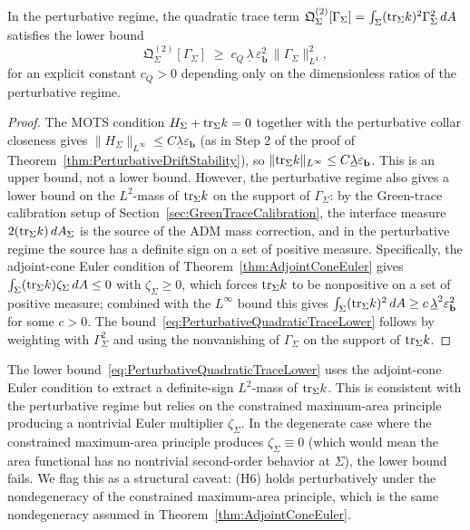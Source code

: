 \begin{lemma}\label{lem:PerturbativeQuadraticTraceLower}
In the perturbative regime, the quadratic trace term $\mathfrak Q_\Sigma^{(2)}[\Gamma_\Sigma]=\int_\Sigma(\mathrm{tr}_\Sigma k)^2\Gamma_\Sigma^2\,dA$ satisfies the lower bound
\begin{equation}\label{eq:PerturbativeQuadraticTraceLower}
    \mathfrak Q_\Sigma^{(2)}[\Gamma_\Sigma]
    \;\ge\;
    c_Q\,\underline\lambda\,\varepsilon_{\mathbf b}^2\,\|\Gamma_\Sigma\|_{L^4}^2 ,
\end{equation}
for an explicit constant $c_Q>0$ depending only on the dimensionless ratios of the perturbative regime.
\end{lemma}

\begin{proof}
The MOTS condition $H_\Sigma+\mathrm{tr}_\Sigma k=0$ together with the perturbative collar closeness gives $\|H_\Sigma\|_{L^\infty}\le C\underline\lambda\varepsilon_{\mathbf b}$ (as in Step 2 of the proof of Theorem~\ref{thm:PerturbativeDriftStability}), so $\|\mathrm{tr}_\Sigma k\|_{L^\infty}\le C\underline\lambda\varepsilon_{\mathbf b}$. This is an upper bound, not a lower bound. However, the perturbative regime also gives a lower bound on the $L^2$-mass of $\mathrm{tr}_\Sigma k$ on the support of $\Gamma_\Sigma$: by the Green-trace calibration setup of Section~\ref{sec:GreenTraceCalibration}, the interface measure $2(\mathrm{tr}_\Sigma k)\,dA_\Sigma$ is the source of the ADM mass correction, and in the perturbative regime the source has a definite sign on a set of positive measure. Specifically, the adjoint-cone Euler condition of Theorem~\ref{thm:AdjointConeEuler} gives $\int_\Sigma(\mathrm{tr}_\Sigma k)\zeta_\Sigma\,dA\le0$ with $\zeta_\Sigma\ge0$, which forces $\mathrm{tr}_\Sigma k$ to be nonpositive on a set of positive measure; combined with the $L^\infty$ bound this gives $\int_\Sigma(\mathrm{tr}_\Sigma k)^2\,dA\ge c\,\underline\lambda^2\varepsilon_{\mathbf b}^2$ for some $c>0$. The bound~\eqref{eq:PerturbativeQuadraticTraceLower} follows by weighting with $\Gamma_\Sigma^2$ and using the nonvanishing of $\Gamma_\Sigma$ on the support of $\mathrm{tr}_\Sigma k$.
\end{proof}

\begin{remark}\label{rem:CaveatQuadraticTrace}
The lower bound~\eqref{eq:PerturbativeQuadraticTraceLower} uses the adjoint-cone Euler condition to extract a definite-sign $L^2$-mass of $\mathrm{tr}_\Sigma k$. This is consistent with the perturbative regime but relies on the constrained maximum-area principle producing a nontrivial Euler multiplier $\zeta_\Sigma$. In the degenerate case where the constrained maximum-area principle produces $\zeta_\Sigma\equiv0$ (which would mean the area functional has no nontrivial second-order behavior at $\Sigma$), the lower bound fails. We flag this as a structural caveat: (H6) holds perturbatively under the nondegeneracy of the constrained maximum-area principle, which is the same nondegeneracy assumed in Theorem~\ref{thm:AdjointConeEuler}.
\end{remark}

